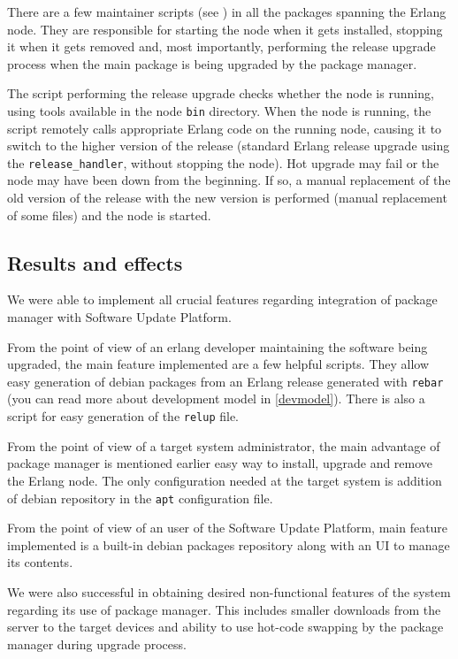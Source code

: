 There are a few maintainer scripts (see \cite{maintainerscripts}) in all the packages spanning the Erlang node.
They are responsible for starting the node when it gets installed, stopping it when it gets
removed and, most importantly, performing the release upgrade process when the main package is being
upgraded by the package manager.

The script performing the release upgrade checks whether the node is running, using tools available in the node {\tt bin} directory.
When the node is running, the script remotely calls appropriate Erlang code on the running node, causing it to switch to the higher
version of the release (standard Erlang release upgrade using the {\tt release\_handler}, without stopping the node).
Hot upgrade may fail or the node may have been down from the beginning. If so, a manual replacement of the old version of the release with the new version is performed (manual replacement of some files) and the node is started.

\subsection{Results and effects}

We were able to implement all crucial features regarding integration of package manager
with Software Update Platform.

From the point of view of an erlang developer maintaining the software being upgraded, the main
feature implemented are a few helpful scripts. They allow easy generation of debian packages from
an Erlang release generated with {\tt rebar} (you can read more about development model in \ref{devmodel}).
There is also a script for easy generation of the {\tt relup} file.

From the point of view of a target system administrator, the main advantage of package manager
is mentioned earlier easy way to install, upgrade and remove the Erlang node. The only configuration
needed at the target system is addition of debian repository in the {\tt apt} configuration file.

From the point of view of an user of the Software Update Platform, main feature implemented is
a built-in debian packages repository along with an UI to manage its contents.

We were also successful in obtaining desired non-functional features of the system regarding its use
of package manager. This includes smaller downloads from the server to the target devices and ability
to use hot-code swapping by the package manager during upgrade process.

